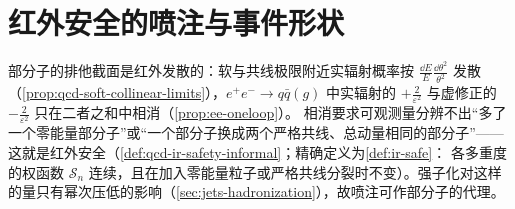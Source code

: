 \section{红外安全的喷注与事件形状}\label{sec:jets-irsafe}

部分子的排他截面是红外发散的：软与共线极限附近实辐射概率按 $\frac{\dd E}{E}\frac{\dd\theta^2}{\theta^2}$ 发散（\cref{prop:qcd-soft-collinear-limits}），$e^+e^-\to q\bar q(g)$ 中实辐射的 $+\frac{2}{\varepsilon^2}$ 与虚修正的 $-\frac{2}{\varepsilon^2}$ 只在二者之和中相消（\cref{prop:ee-oneloop}）。
相消要求可观测量分辨不出“多了一个零能量部分子”或“一个部分子换成两个严格共线、总动量相同的部分子”——这就是红外安全（\cref{def:qcd-ir-safety-informal}；精确定义为\cref{def:ir-safe}：
各多重度的权函数 $\mathcal S_n$ 连续，且在加入零能量粒子或严格共线分裂时不变）。强子化对这样的量只有幂次压低的影响（\cref{sec:jets-hadronization}），故喷注可作部分子的代理。

